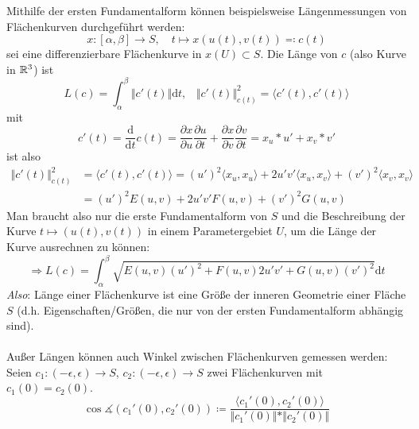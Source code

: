 \begin{remark}
  Mithilfe der ersten Fundamentalform können beispielsweise Längenmessungen von Flächenkurven durchgeführt werden:
  \begin{equation*}
    x: [\alpha, \beta] \to S, \quad t \mapsto x(u(t), v(t)) \eqqcolon c(t)
  \end{equation*}
  sei eine differenzierbare Flächenkurve in $ x(U) \subset S $. Die Länge von $ c $ (also Kurve in $ \mathbb{R}^3 $) ist
  \begin{equation*}
    L(c) = \int_\alpha^\beta \Vert c'(t) \Vert \text{d}t\text{,} \quad \Vert c'(t) \Vert_{c(t)}^2 = \langle c'(t), c'(t) \rangle
  \end{equation*}
  mit
  \begin{equation*}
    c'(t) = \frac{\text{d}}{\text{d}t}c(t) = \frac{\partial x}{\partial u} \frac{\partial u}{\partial t} + \frac{\partial x}{\partial v} \frac{\partial v}{\partial t} = x_u * u' + x_v * v'
  \end{equation*}
  ist also
  \begin{align*}
    \Vert c'(t) \Vert_{c(t)}^2 &= \langle c'(t), c'(t) \rangle = (u')^2\langle x_u, x_u \rangle + 2u'v'\langle x_u, x_v \rangle + (v')^2\langle x_v, x_v \rangle \\
    &= (u')^2E(u,v) + 2u'v'F(u,v) + (v')^2G(u,v)
  \end{align*}
  Man braucht also nur die erste Fundamentalform von $ S $ und die Beschreibung der Kurve $ t \mapsto (u(t),v(t)) $ in einem Parametergebiet $ U $, um die Länge der Kurve ausrechnen zu können:
  \begin{equation*}
    \Rightarrow L(c) = \int_\alpha^\beta \sqrt{E(u,v)(u')^2 + F(u,v)2u'v' + G(u,v)(v')^2}\text{d}t
  \end{equation*}
  \emph{Also}: Länge einer Flächenkurve ist eine Größe der inneren Geometrie einer Fläche $ S $ (d.h. Eigenschaften/Größen, die nur von der ersten Fundamentalform abhängig sind). \\
  \ \\
  Außer Längen können auch Winkel zwischen Flächenkurven gemessen werden: \\
  Seien $ c_1: (-\epsilon, \epsilon) \to S $, $ c_2: (-\epsilon, \epsilon) \to S $ zwei Flächenkurven mit $ c_1(0) = c_2(0) $.
  \begin{equation*}
    \cos \measuredangle (c_1'(0),c_2'(0)) \coloneqq \frac{\langle c_1'(0), c_2'(0) \rangle}{\Vert c_1'(0) \Vert * \Vert c_2'(0) \Vert}
  \end{equation*}
\end{remark}